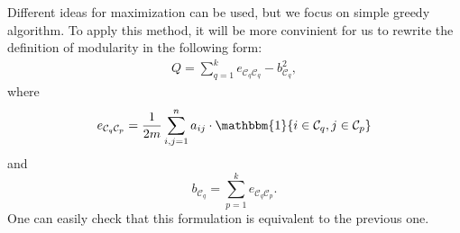 Different ideas for maximization can be used, but we focus on simple greedy algorithm. To apply this method, it will be more convinient for us to rewrite the definition of modularity in the following form:
 \begin{equation}
    \begin{aligned}
    Q = \sum\limits_{q=1}^{k} e_{{\mathcal{C}_q}{\mathcal{C}_q}} - b^2_{\mathcal{C}_q}, 
    \nonumber
    \end{aligned}
\end{equation}
where 
\[
    e_{{\mathcal{C}_q}{\mathcal{C}_p}} = \frac{1}{2m} \sum\limits_{i,j=1}^{n} a_{ij} \cdot \mathbbm{1}\{ i \in {\mathcal{C}_q}, j \in {\mathcal{C}_p}\}
\]
and 
\[
b_{\mathcal{C}_q} = \sum\limits_{p=1}^{k} e_{{\mathcal{C}_q}{\mathcal{C}_p}}.
\]
One can easily check that this formulation is equivalent to the previous one.

